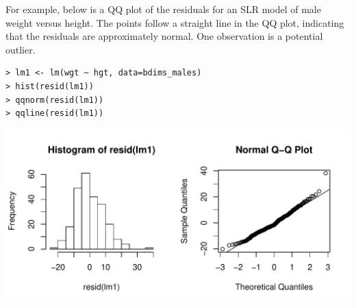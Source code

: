 \documentclass[10pt]{beamer}
\begin{document}
\begin{frame}[fragile]
For example, below is a QQ plot of the residuals for an SLR model of male weight versus height.  The points follow a straight line in the QQ plot, indicating that the residuals are approximately normal.  One observation is a potential outlier.
\small
\begin{verbatim}
> lm1 <- lm(wgt ~ hgt, data=bdims_males)
> hist(resid(lm1))
> qqnorm(resid(lm1))
> qqline(resid(lm1))
\end{verbatim}
\begin{center}
\includegraphics[scale=0.5]{figure/qqres.pdf}
\end{center}
\end{frame}


\end{document}
